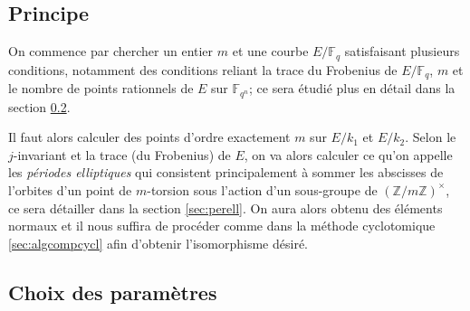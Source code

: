 \documentclass[a4paper]{article} %
\numberwithin{section}{part}
\numberwithin{equation}{section}
\newcommand\zmodninv[1]{(\mathbb{Z}/#1\mathbb{Z})^{\times}}
\newcommand\GF[1]{\mathbb{F}_{#1}}
\begin{document}
\subsection{Principe}
On commence par chercher un entier $m$ et une courbe $E/\GF{q}$ satisfaisant
plusieurs conditions, notamment des conditions reliant la trace du Frobenius de
$E/\GF{q}$, $m$ et le nombre de points rationnels de $E$ sur $\GF{q^n}$; ce sera
étudié plus en détail dans la section \ref{sec:choixparam}.\par
Il faut alors calculer des points d'ordre exactement $m$ sur $E/k_1$ et $E/k_2$.
Selon le $j$-invariant et la trace (du Frobenius) de $E$, on va alors calculer
ce qu'on appelle les \emph{périodes elliptiques} qui consistent principalement à
sommer les abscisses de l'orbites d'un point de $m$-torsion sous l'action d'un
sous-groupe de $\zmodninv{m}$, ce sera détailler dans la section
\ref{sec:perell}. On aura alors obtenu des éléments normaux et il nous suffira 
de procéder comme dans la méthode cyclotomique \ref{sec:algcompcycl} afin
d'obtenir l'isomorphisme désiré.

\subsection{Choix des paramètres}
\label{sec:choixparam}
\end{document}
